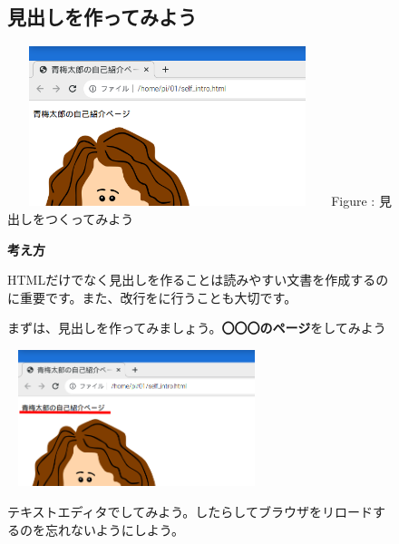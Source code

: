 \documentclass[a4paper,12pt]{jarticle}
\begin{document}
\vfill
\clearpage
\begin{figure}[ht]
  \subsection{\theExercise 見出しを作ってみよう}


  \centering
  \begin{minipage}{9.327cm}
    {\upshape
      \includegraphics[width=9.327cm,height=4.662cm]{textbook-img153.png}
      \newline
      Figure : 見出しをつくってみよう}
  \end{minipage}


  \bigskip
  \flushleft

  \textbf{考え方}



  \begin{minipage}{16.576cm}
    \flushleft

    HTMLだけでなく見出しを作ることは読みやすい文書を作成するのに重要です。また、改行をに行うことも大切です。

    まずは、見出しを作ってみましょう。\textbf{〇〇〇のページ}をしてみよう


    \bigskip

    \includegraphics[width=7.544cm,height=3.981cm]{textbook-img154.png}


    \bigskip

    テキストエディタでしてみよう。したらしてブラウザをリロードするのを忘れないようにしよう。



\end{minipage}
\end{figure}
\end{document}
